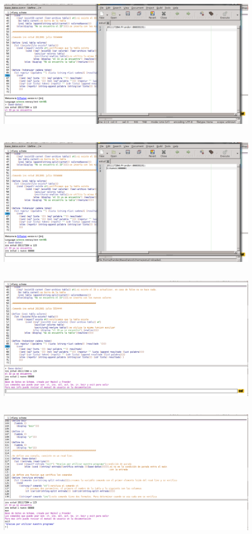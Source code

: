 \documentclass[12pt,a4paper]{report}
\begin{document}
\begin{flushleft}
\includegraphics[scale=0.48]{ins1.png} \\\

\includegraphics[scale=0.48]{ins2.png} \\\

\includegraphics[scale=0.48]{man.png} \\\

\includegraphics[scale=0.48]{man1.png} \\\

\end{flushleft}
\end{document}
